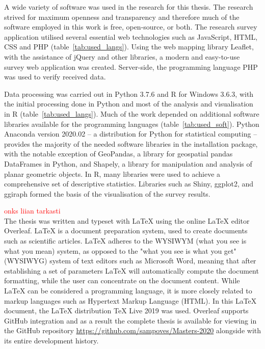 A wide variety of software was used in the research for this thesis. The research strived for maximum openness and transparency and therefore much of the software employed in this work is free, open-source, or both. The research survey application utilised several essential web technologies such as JavaScript, HTML, CSS and PHP (table~\ref{tab:used_langs}). Using the web mapping library Leaflet, with the assistance of jQuery and other libraries, a modern and easy-to-use survey web application was created. Server-side, the programming language PHP was used to verify received data.

Data processing was carried out in Python 3.7.6 and R for Windows 3.6.3, with the initial processing done in Python and most of the analysis and visualisation in R (table~\ref{tab:used_langs}). Much of the work depended on additional software libraries available for the programming languages (table~\ref{tab:used_soft}). Python Anaconda version 2020.02 -- a distribution for Python for statistical computing -- provides the majority of the needed software libraries in the installation package, with the notable exception of GeoPandas, a library for geospatial pandas DataFrames in Python, and Shapely, a library for manipulation and analysis of planar geometric objects. In R, many libraries were used to achieve a comprehensive set of descriptive statistics. Libraries such as Shiny, ggplot2, and ggiraph formed the basis of the visualisation of the survey results.

\textcolor{red}{onks liian tarkasti} \\
The thesis was written and typeset with LaTeX using the online LaTeX editor Overleaf. LaTeX is a document preparation system, used to create documents such as scientific articles. LaTeX adheres to the WYSIWYM (what you see is what you mean) system, as opposed to the "what you see is what you get" (WYSIWYG) system of text editors such as Microsoft Word, meaning that after establishing a set of parameters LaTeX will automatically compute the document formatting, while the user can concentrate on the document content. While LaTeX can be considered a programming language, it is more closely related to markup languages such as Hypertext Markup Language (HTML). In this LaTeX document, the LaTeX distribution TeX Live 2019 was used. Overleaf supports GitHub integration and as a result the complete thesis is available for viewing in the GitHub repository \textcolor{blue}{\url{https://github.com/sampoves/Masters-2020}} alongside with its entire development history.

